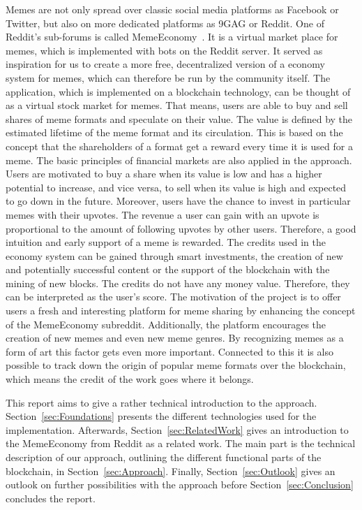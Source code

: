 \documentclass[12pt]{article}
\begin{document}
    Memes are not only spread over classic social media platforms as Facebook or Twitter, but also on more dedicated platforms as 9GAG or Reddit. One of Reddit's sub-forums is called MemeEconomy~\cite{MemeEconReddit}. It is a virtual market place for memes, which is implemented with bots on the Reddit server. It served as inspiration for us to create a more free, decentralized version of a economy system for memes, which can therefore be run by the community itself.
    The application, which is implemented on a blockchain technology, can be thought of as a virtual stock market for memes. That means, users are able to buy and sell shares of meme formats and speculate on their value. The value is defined by the estimated lifetime of the meme format and its circulation. This is based on the concept that the shareholders of a format get a reward every time it is used for a meme. The basic principles of financial markets are also applied in the approach. Users are motivated to buy a share when its value is low and has a higher potential to increase, and vice versa, to sell when its value is high and expected to go down in the future.
    Moreover, users have the chance to invest in particular memes with their upvotes. The revenue a user can gain with an upvote is proportional to the amount of following upvotes by other users. Therefore, a good intuition and early support of a meme is rewarded.
    The credits used in the economy system can be gained through smart investments, the creation of new and potentially successful content or the support of the blockchain with the mining of new blocks. The credits do not have any money value. Therefore, they can be interpreted as the user's score.
    The motivation of the project is to offer users a fresh and interesting platform for meme sharing by enhancing the concept of the MemeEconomy subreddit. Additionally, the platform encourages the creation of new memes and even new meme genres. By recognizing memes as a form of art this factor gets even more important. Connected to this it is also possible to track down the origin of popular meme formats over the blockchain, which means the credit of the work goes where it belongs.

    This report aims to give a rather technical introduction to the approach. Section~\ref{sec:Foundations} presents the different technologies used for the implementation. Afterwards, Section~\ref{sec:RelatedWork} gives an introduction to the MemeEconomy from Reddit as a related work. The main part is the technical description of our approach, outlining the different functional parts of the blockchain, in Section~\ref{sec:Approach}. Finally, Section~\ref{sec:Outlook} gives an outlook on further possibilities with the approach before Section~\ref{sec:Conclusion} concludes the report.
\end{document}
